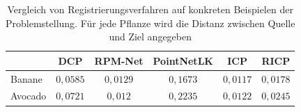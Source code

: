 \documentclass[12pt,titlepage, twoside]{article}
\begin{document}
\begin{table}
    \begin{center}
    \begin{tabular}{|l || c | c | c | c | c | } 
        \hline
         & DCP & RPM-Net & PointNetLK & ICP & RICP \\  
        \hline
        \hline
        Banane & $0,0585$ & $0,0129$& $0,1673$& $0,0117$& $0,0178$\\
        \hline
        Avocado & $0,0721$& $0,012$& $0,2235$& $0,0122$& $0,0245$\\
        \hline
    \end{tabular}
    \end{center}
    \caption{Vergleich von Registrierungsverfahren auf konkreten Beispielen der Problemstellung. Für jede Pflanze wird die Distanz zwischen Quelle und Ziel angegeben}
    \label{tab:registration:real:compare}
\end{table}
\end{document}
